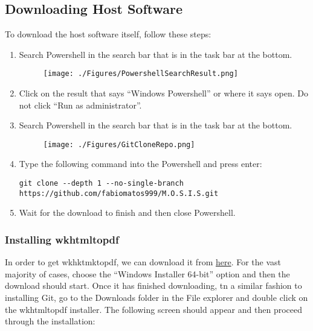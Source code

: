 \documentclass[12pt]{article}
\begin{document}
\subsection{Downloading Host Software}
To download the host software itself, follow these steps:
\begin{center}
	\begin{enumerate}
		\begin{figure}[H]
			\texttt{[image: ./Figures/SearchBar.png]}
		\end{figure}
		\item Search Powershell in the search bar that is in the task bar at the bottom.
		      \begin{figure}[H]
			      \texttt{[image: ./Figures/PowershellSearchResult.png]}
		      \end{figure}
		\item Click on the result that says ``Windows Powershell'' or where it says open. Do not click ``Run as administrator''.
		\item Search Powershell in the search bar that is in the task bar at the bottom.
		      \begin{figure}[H]
			      \texttt{[image: ./Figures/GitCloneRepo.png]}
		      \end{figure}
		\item Type the following command into the Powershell and press enter:
		      \begin{verbatim}
git clone --depth 1 --no-single-branch https://github.com/fabiomatos999/M.O.S.I.S.git
                      \end{verbatim}
		\item Wait for the download to finish and then close Powershell.
	\end{enumerate}
\end{center}
\subsubsection{Installing wkhtmltopdf}
In order to get wkhktmktopdf, we can download it from \href{https://wkhtmltopdf.org/downloads.html}{here}. For the vast majority of cases, choose the ``Windows Installer 64-bit'' option and then the download should start. Once it has finished downloading, tn a similar fashion to installing Git, go to the Downloads folder in the File explorer and double click on the wkhtmltopdf installer. The following screen should appear and then proceed through the installation:
\end{document}
